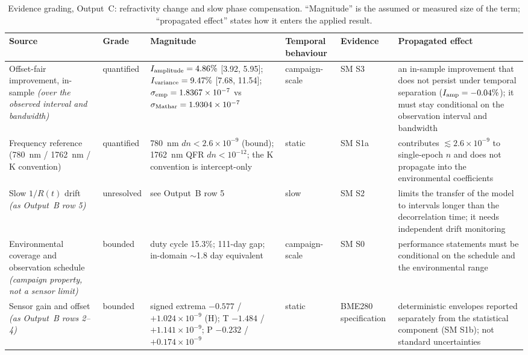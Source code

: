 \documentclass[aps,prapplied,reprint,superscriptaddress]{revtex4-2}
\begin{document}
\begin{table}[tbp]
\centering
\caption{Evidence grading, Output~C: refractivity change and slow phase compensation. ``Magnitude'' is the assumed or measured size of the term; ``propagated effect'' states how it enters the applied result.}
\label{tab:S4c}
\footnotesize
\setlength{\tabcolsep}{4pt}
\begin{tabular}{@{}p{}p{}p{}p{}p{}p{}@{}}
\hline
\textbf{Source} & \textbf{Grade} & \textbf{Magnitude} & \textbf{Temporal behaviour} & \textbf{Evidence} & \textbf{Propagated effect} \\
\hline
Offset-fair improvement, in-sample \emph{(over the observed interval and bandwidth)} & quantified & $I_{\rm amplitude} = 4.86\%$ [3.92, 5.95]; $I_{\rm variance} = 9.47\%$ [7.68, 11.54]; $\sigma_{\rm emp} = 1.8367\times10^{-7}$ vs $\sigma_{\rm Mathar} = 1.9304\times10^{-7}$ & campaign-scale & SM S3 & an in-sample improvement that does not persist under temporal separation ($I_{\rm amp} = -0.04\%$); it must stay conditional on the observation interval and bandwidth  \\
Frequency reference (\SI{780}{\nano\meter} / \SI{1762}{\nano\meter} / K convention) & quantified & \SI{780}{\nano\meter} $dn < 2.6\times10^{-9}$ (bound); \SI{1762}{\nano\meter} QFR $dn < 10^{-12}$; the K convention is intercept-only & static & SM S1a & contributes $\lesssim 2.6\times10^{-9}$ to single-epoch $n$ and does not propagate into the environmental coefficients  \\
Slow $1/R(t)$ drift \emph{(as Output~B row 5)} & unresolved & see Output~B row 5 & slow & SM S2 & limits the transfer of the model to intervals longer than the decorrelation time; it needs independent drift monitoring  \\
Environmental coverage and observation schedule \emph{(campaign property, not a sensor limit)} & bounded & duty cycle 15.3\%; 111-day gap; in-domain $\sim$1.8 day equivalent & campaign-scale & SM S0 & performance statements must be conditional on the schedule and the environmental range  \\
Sensor gain and offset \emph{(as Output~B rows 2--4)} & bounded & signed extrema $-0.577$ / $+1.024\times10^{-9}$ (H); T $-1.484$ / $+1.141\times10^{-9}$; P $-0.232$ / $+0.174\times10^{-9}$ & static & BME280 specification & deterministic envelopes reported separately from the statistical component (SM S1b); not standard uncertainties  \\
\hline
\end{tabular}
\end{table}


\end{document}
